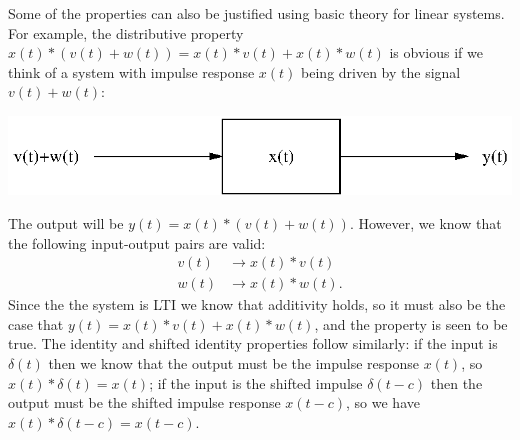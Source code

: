\documentclass[10pt]{beamer}
\newcommand{\conv}{\ast}
\begin{document}
Some of the properties can also be justified using basic theory for linear systems.  For example, the distributive property $x(t) \conv (v(t) + w(t)) = x(t) \conv v(t) + x(t) \conv w(t)$ is obvious if we think of a system with impulse response $x(t)$ being driven by the signal $v(t) + w(t)$:
\begin{center}
  \includegraphics{simpleltisystem1}
\end{center}
The output will be $y(t) = x(t) \conv (v(t) + w(t))$.  However, we know that the following input-output pairs are valid:
\begin{align*}
  v(t) & \longrightarrow x(t) \conv v(t) \\
  w(t) & \longrightarrow x(t) \conv w(t).
\end{align*}
Since the the system is LTI we know that additivity holds, so it must also be the case that $y(t) = x(t) \conv v(t) + x(t) \conv w(t)$, and the property is seen to be true.  The identity and shifted identity properties follow similarly:  if the input is $\delta(t)$ then we know that the output must be the impulse response $x(t)$, so $x(t) \conv \delta(t) = x(t)$;  if the input is the shifted impulse $\delta(t - c)$ then the output must be the shifted impulse response $x(t - c)$, so we have $x(t) \conv \delta(t - c) = x(t - c)$.
\end{document}
